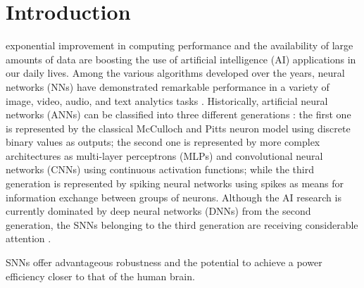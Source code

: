 
\section{Introduction}
\label{sec:introduction}
 exponential improvement in computing performance and the availability of large amounts of data are boosting the use of artificial intelligence (AI) applications in our daily lives. Among the various algorithms developed over the years, neural networks (NNs) have demonstrated remarkable performance in a variety of image, video, audio, and text analytics tasks \cite{schmidhuber2015deep,Taigman_2014_CVPR}. Historically, artificial neural networks (ANNs) can be classified into three different generations \cite{Design_Exploration_SbS_Trans20}: the first one is represented by the classical McCulloch and Pitts neuron model using discrete binary values as outputs; the second one is represented by more complex architectures as multi-layer perceptrons (MLPs) and convolutional neural networks (CNNs) using continuous activation functions; while the third generation is represented by spiking neural networks using spikes as means for information exchange between groups of neurons. Although the AI research is currently dominated by deep neural networks (DNNs) from the second generation,  the SNNs belonging to the third generation are receiving considerable attention \cite{Spinnaker_Trans13,ernst2007efficient,Design_Exploration_SbS_Trans20, SNN_Survey_Trans19}.

SNNs offer advantageous robustness and the potential to achieve a power efficiency closer to that of the human brain.

